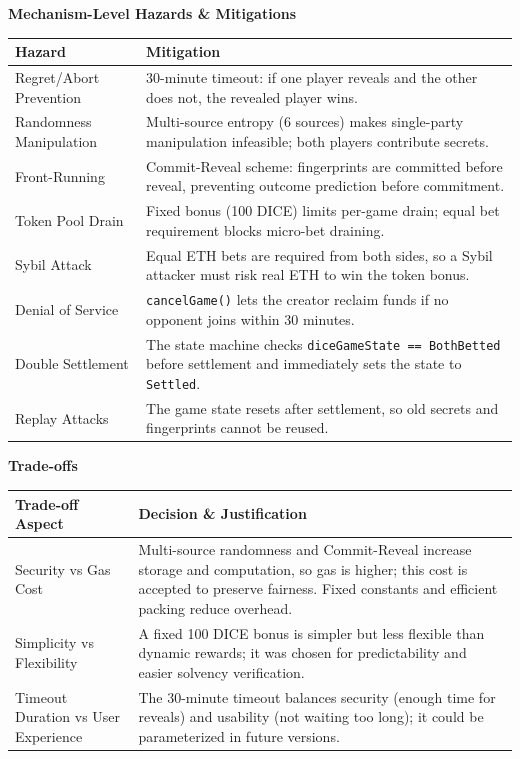 \documentclass[10pt,a4paper]{article}
\begin{document}
\medskip
\noindent\textbf{Mechanism-Level Hazards \& Mitigations}

\smallskip
\noindent\begin{tabularx}{\textwidth}{@{}>{\raggedright\arraybackslash}p{}X@{}}
\toprule
\textbf{Hazard} & \textbf{Mitigation} \\
\midrule
Regret/Abort Prevention & 30-minute timeout: if one player reveals and the other does not, the revealed player wins. \\
Randomness Manipulation & Multi-source entropy (6 sources) makes single-party manipulation infeasible; both players contribute secrets. \\
Front-Running & Commit-Reveal scheme: fingerprints are committed before reveal, preventing outcome prediction before commitment. \\
Token Pool Drain & Fixed bonus (100 DICE) limits per-game drain; equal bet requirement blocks micro-bet draining. \\
Sybil Attack & Equal ETH bets are required from both sides, so a Sybil attacker must risk real ETH to win the token bonus. \\
Denial of Service & \texttt{cancelGame()} lets the creator reclaim funds if no opponent joins within 30 minutes. \\
Double Settlement & The state machine checks \texttt{diceGameState == BothBetted} before settlement and immediately sets the state to \texttt{Settled}. \\
Replay Attacks & The game state resets after settlement, so old secrets and fingerprints cannot be reused. \\
\bottomrule
\end{tabularx}

\medskip
\noindent\textbf{Trade-offs}

\smallskip
\noindent\begin{tabularx}{\textwidth}{@{}>{\raggedright\arraybackslash}p{}X@{}}
\toprule
\textbf{Trade-off Aspect} & \textbf{Decision \& Justification} \\
\midrule
Security vs Gas Cost & Multi-source randomness and Commit-Reveal increase storage and computation, so gas is higher; this cost is accepted to preserve fairness. Fixed constants and efficient packing reduce overhead. \\
Simplicity vs Flexibility & A fixed 100 DICE bonus is simpler but less flexible than dynamic rewards; it was chosen for predictability and easier solvency verification. \\
Timeout Duration vs User Experience & The 30-minute timeout balances security (enough time for reveals) and usability (not waiting too long); it could be parameterized in future versions. \\
\bottomrule
\end{tabularx}
\endgroup
\end{document}
